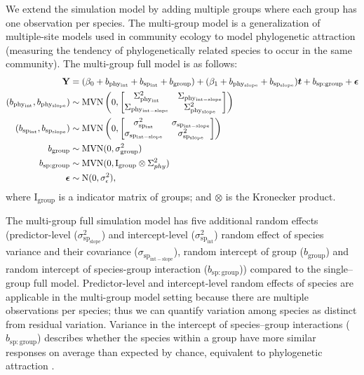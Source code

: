 \documentclass[12pt]{article}
\begin{document}
We extend the simulation model by adding multiple groups where each group has one observation per species. 
The multi-group model is a generalization of multiple-site models used in community ecology to model phylogenetic attraction (measuring the tendency of phylogenetically related species to occur in the same community). 
The multi-group full model is as follows: 
\begin{equation}
\begin{aligned}
{\mathbf Y} & = (\beta_0 + b_{\mathrm{phy_{int}}} + b_{\mathrm{sp_{int}}} + b_{\mathrm{group}}) + (\beta_1 + b_{\mathrm{phy_{slope}}} + b_{\mathrm{sp_{slope}}}) \bm{t} + b_{\mathrm{sp:group}} + {\boldsymbol \epsilon} \\
(b_{\mathrm{phy_{int}}}, b_{\mathrm{phy_{slope}}}) & \sim \textrm{MVN} \left( 0, \begin{bmatrix}
\Sigma^2_{\mathrm{phy_{int}}} & \Sigma_{\mathrm{phy_{int-slope}}} \\ 
\Sigma_{\mathrm{phy_{int-slope}}} & \Sigma^2_{\mathrm{phy_{slope}}}
\end{bmatrix}
\right) \\
(b_{\mathrm{sp_{int}}}, b_{\mathrm{sp_{slope}}}) & \sim \textrm{MVN} \left( 0, \begin{bmatrix}
\sigma^2_{\mathrm{sp_{int}}} & \sigma_{\mathrm{sp_{int-slope}}} \\ 
\sigma_{\mathrm{sp_{int-slope}}} & \sigma^2_{\mathrm{sp_{slope}}}
\end{bmatrix}
\right) \\
b_{\mathrm{group}} & \sim \textrm{MVN} ( 0 , \sigma^2_{\mathrm{group}}) \\
b_{\mathrm{sp:group}} & \sim \textrm{MVN} (0, \mathrm{I}_{\mathrm{group}} \otimes \Sigma^2_{phy}) \\
{\boldsymbol \epsilon} & \sim \textrm{N} ( 0 , \sigma_{\epsilon}^2),
\label{eq:multiple_glmm}
\end{aligned}
\end{equation}
where $\textrm{I}_{\textrm{group}}$ is a indicator matrix of groups; and $\otimes$ is the Kronecker product.

The multi-group full simulation model has five additional random effects (predictor-level ($\sigma^2_{\mathrm{sp_{slope}}}$) and intercept-level ($\sigma^2_{\mathrm{sp_{int}}}$) random effect of species variance and their covariance ($\sigma_{\mathrm{sp_{int-slope}}}$), random intercept of group ($b_{\mathrm{group}}$) and random intercept of species-group interaction ($b_{\mathrm{sp:group}}$)) compared to the single--group full model.
Predictor-level and intercept-level random effects of species are applicable in the multi-group model setting because there are multiple observations per species; thus we can quantify variation among species as distinct from residual variation.
Variance in the intercept of species--group interactions ($b_{\mathrm{sp:group}}$) describes whether the species within a group have more similar responses on average than expected by chance, equivalent to phylogenetic attraction \citep{helmus2007separating}. 
\end{document}
